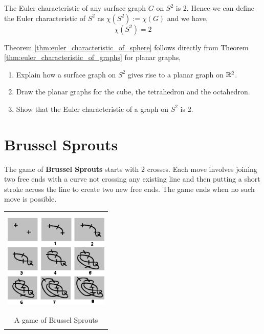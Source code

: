 \begin{thm}\label{thm:euler_characteristic_of_sphere}
	The Euler characteristic of any surface graph $G$	on $ S ^ 2 $ is 2. Hence we can define the Euler characteristic of $ S^2 $ as $\chi(S^2):= \chi(G)$ and we have, $$ \chi(S ^ 2) = 2 $$
\end{thm}


\begin{exercise}
	Theorem \ref{thm:euler_characteristic_of_sphere} follows directly from Theorem \ref{thm:euler_characteristic_of_graphs} for planar graphs,
	\begin{enumerate}
		\item Explain how a surface graph on $ S ^ 2 $ gives rise to a planar graph on $ \mathbb{R} ^ 2 $.
		\item Draw the planar graphs for the cube, the tetrahedron and the octahedron.
		\item Show that the Euler characteristic of a graph on $ S ^ 2 $ is 2.
	\end{enumerate}
\end{exercise}

\section{Brussel Sprouts}
The game of \textbf{Brussel Sprouts} starts with 2 crosses. Each move involves joining two free ends with a curve not crossing any existing line and then putting a short stroke across the line to create two new free ends. The game ends when no such move is possible.
\begin{center}
	\begin{tabular}{c}
		{\includegraphics[width=5cm, height=5cm] {images/brussel_sprouts}} \\
		A game of Brussel Sprouts                                          \\\\
	\end{tabular}
\end{center}

